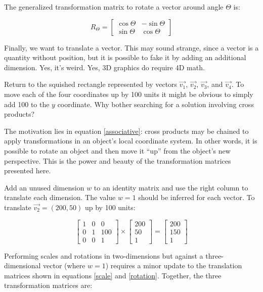 \documentclass{book}
\begin{document}
The generalized transformation matrix to rotate a vector around angle $\Theta$ is:

\begin{equation}\label{rotation}
R_\Theta = \begin{bmatrix}\cos{\Theta} & -\sin{\Theta} \\ \sin{\Theta} & \cos{\Theta}\end{bmatrix}
\end{equation}

Finally, we want to translate a vector. This may sound strange, since a vector is a quantity without position, but it is possible to fake it by adding an additional dimension. Yes, it's weird. Yes, 3D graphics do require 4D math.

Return to the squished rectangle represented by vectors $\vec{v_1}$, $\vec{v_2}$, $\vec{v_3}$, and $\vec{v_4}$. To move each of the four coordinates up by 100 units it might be obvious to simply add 100 to the $y$ coordinate. Why bother searching for a solution involving cross products?

The motivation lies in equation \ref{associative}: cross products may be chained to apply transformations in an object's local coordinate system. In other words, it is possible to rotate an object and then move it ``up'' from the object's new perspective. This is the power and beauty of the transformation matrices presented here.

Add an unused dimension $w$ to an identity matrix and use the right column to translate each dimension. The value $w=1$ should be inferred for each vector. To translate $\vec{v_2}=(200,50)$ up by 100 units:

\begin{equation*}
\begin{bmatrix}1 & 0 & 0 \\ 0 & 1 & 100 \\ 0 & 0 & 1 \end{bmatrix} \times
\begin{bmatrix}200 \\ 50 \\ 1\end{bmatrix} = 
\begin{bmatrix}200 \\ 150 \\ 1\end{bmatrix}
\end{equation*}

Performing scales and rotations in two-dimensions but against a three-dimensional vector (where $w=1$) requires a minor update to the translation matrices shown in equations \ref{scale} and \ref{rotation}. Together, the three transformation matrices are:
\end{document}
